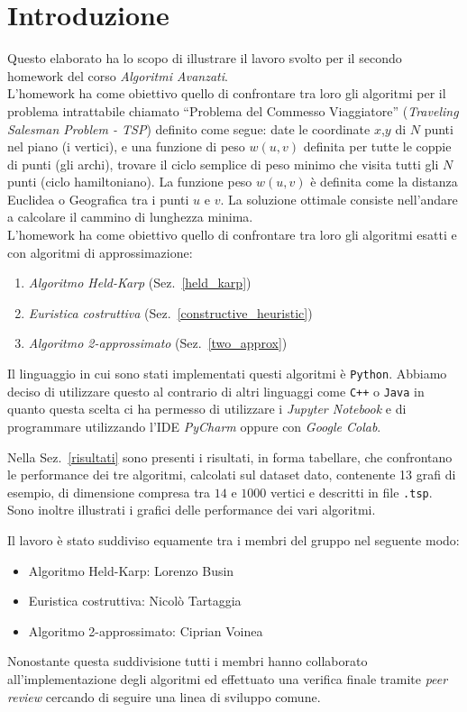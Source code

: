 \section{Introduzione}
Questo elaborato ha lo scopo di illustrare il lavoro svolto per il secondo homework del corso \textit{Algoritmi Avanzati}.\\
L'homework ha come obiettivo quello di confrontare tra loro gli algoritmi per il problema intrattabile chiamato ``Problema del Commesso Viaggiatore'' (\textit{Traveling Salesman Problem - TSP}) definito come segue: date le coordinate $x$,$y$ di $N$ punti nel piano (i vertici), e una funzione di peso $w(u,v)$ definita per tutte le coppie di punti (gli archi), trovare il ciclo semplice di peso minimo che visita tutti gli $N$ punti (ciclo hamiltoniano). La funzione peso $w(u,v)$ è definita come la distanza Euclidea o Geografica tra i punti $u$ e $v$. La soluzione ottimale consiste nell'andare a calcolare il cammino di lunghezza minima.  
\\
L'homework ha come obiettivo quello di confrontare tra loro gli algoritmi esatti e con algoritmi di approssimazione:
\begin{enumerate}
	\item \textit{Algoritmo Held-Karp} (Sez.~\ref{held_karp})
	\item \textit{Euristica costruttiva} (Sez.~\ref{constructive_heuristic})
	\item \textit{Algoritmo 2-approssimato} (Sez.~\ref{two_approx})
\end{enumerate}


Il linguaggio in cui sono stati implementati questi algoritmi è \texttt{Python}.
Abbiamo deciso di utilizzare questo al contrario di altri linguaggi come \texttt{C++} o \texttt{Java} in quanto questa scelta ci ha permesso di utilizzare i \textit{Jupyter Notebook} e di programmare utilizzando l'IDE \textit{PyCharm} oppure con \textit{Google Colab}.

Nella Sez.~\ref{risultati} sono presenti i risultati, in forma tabellare, che confrontano le performance dei tre algoritmi, calcolati sul dataset dato, contenente 13 grafi di esempio, di dimensione compresa tra $14$ e $1000$ vertici e descritti in file \texttt{.tsp}.
Sono inoltre illustrati i grafici delle performance dei vari algoritmi.

Il lavoro è stato suddiviso equamente tra i membri del gruppo nel seguente modo:
\begin{itemize}
	\item Algoritmo Held-Karp: Lorenzo Busin
	\item Euristica costruttiva: Nicolò Tartaggia
	\item Algoritmo 2-approssimato: Ciprian Voinea
\end{itemize}

Nonostante questa suddivisione tutti i membri hanno collaborato all'implementazione degli algoritmi ed effettuato una verifica finale tramite \textit{peer review} cercando di seguire una linea di sviluppo comune.
\pagebreak

